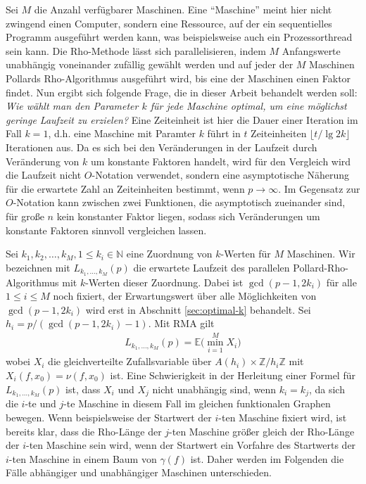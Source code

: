 \documentclass[a4paper, 10pt, ngerman]{article}
\newcommand{\E}{\mathbb{E}}
\newcommand{\N}{\mathbb{N}}
\newcommand{\Z}{\mathbb{Z}}
\begin{document}
Sei $M$ die Anzahl verfügbarer Maschinen. Eine "`Maschine"'  meint hier nicht zwingend einen Computer, sondern eine Ressource, auf der ein sequentielles Programm ausgeführt werden kann, was beispielsweise auch ein Prozessorthread sein kann. Die Rho-Methode lässt sich parallelisieren, indem $M$ Anfangswerte unabhängig voneinander zufällig gewählt werden und auf jeder der $M$ Maschinen Pollards Rho-Algorithmus ausgeführt wird, bis eine der Maschinen einen Faktor findet. Nun ergibt sich folgende Frage, die in dieser Arbeit behandelt werden soll: \emph{Wie wählt man den Parameter $k$ für jede Maschine optimal, um eine möglichst geringe Laufzeit zu erzielen?} Eine Zeiteinheit ist hier die Dauer einer Iteration im Fall $k = 1$, d.h. eine Maschine mit Paramter $k$ führt in $t$ Zeiteinheiten $\lfloor t / \lg 2k \rfloor$ Iterationen aus. Da es sich bei den Veränderungen in der Laufzeit durch Veränderung von $k$ um konstante Faktoren handelt, wird für den Vergleich wird die Laufzeit nicht $O$-Notation verwendet, sondern eine asymptotische Näherung für die erwartete Zahl an Zeiteinheiten bestimmt, wenn $p \to \infty$. Im Gegensatz zur $O$-Notation kann zwischen zwei Funktionen, die asymptotisch zueinander sind, für große $n$ kein konstanter Faktor liegen, sodass sich Veränderungen um konstante Faktoren sinnvoll vergleichen lassen.

Sei $k_1, k_2, \dots, k_M, 1 \le k_i \in \N$ eine Zuordnung von $k$-Werten für $M$ Maschinen.  Wir bezeichnen mit $L_{k_1, \dots, k_M}(p)$ die erwartete Laufzeit des parallelen Pollard-Rho-Algorithmus mit $k$-Werten dieser Zuordnung. Dabei ist $\gcd(p - 1, 2k_i)$ für alle $1 \le i \le M$ noch fixiert, der Erwartungswert über alle Möglichkeiten von $\gcd(p - 1, 2k_i)$ wird erst in Abschnitt \ref{sec:optimal-k} behandelt. Sei $h_i = p/(\gcd(p - 1, 2k_i) - 1)$. Mit RMA gilt
\begin{align}
    L_{k_1, \dots, k_M}(p) = \E \bigg ( \min_{i = 1}^M X_i \bigg )
    \label{lk-definition}
\end{align}
wobei $X_i$ die gleichverteilte Zufallsvariable über $A(h_i) \times \Z/h_i\Z$ mit $X_i(f, x_0) = \nu(f, x_0)$ ist. Eine Schwierigkeit in der Herleitung einer Formel für $L_{k_1, \dots, k_M}(p)$ ist, dass $X_i$ und $X_j$ nicht unabhängig sind, wenn $k_i = k_j$, da sich die $i$-te und $j$-te Maschine in diesem Fall im gleichen funktionalen Graphen bewegen. Wenn beispielsweise der Startwert der $i$-ten Maschine fixiert wird, ist bereits klar, dass die Rho-Länge der $j$-ten Maschine größer gleich der Rho-Länge der $i$-ten Maschine sein wird, wenn der Startwert ein Vorfahre des Startwerts der $i$-ten Maschine in einem Baum von $\gamma(f)$ ist. Daher werden im Folgenden die Fälle abhängiger und unabhängiger Maschinen unterschieden.
\end{document}
